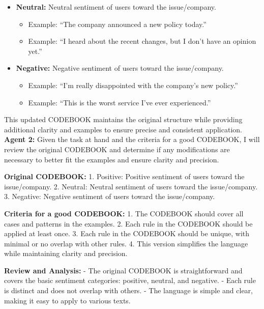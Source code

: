 \begin{itemize}
\tightlist
\item
  \textbf{Neutral:} Neutral sentiment of users toward the issue/company.

  \begin{itemize}
  \tightlist
  \item
    Example: ``The company announced a new policy today.''
  \item
    Example: ``I heard about the recent changes, but I don't have an
    opinion yet.''
  \end{itemize}
\item
  \textbf{Negative:} Negative sentiment of users toward the
  issue/company.

  \begin{itemize}
  \tightlist
  \item
    Example: ``I'm really disappointed with the company's new policy.''
  \item
    Example: ``This is the worst service I've ever experienced.''
  \end{itemize}
\end{itemize}

This updated CODEBOOK maintains the original structure while providing
additional clarity and examples to ensure precise and consistent
application.\\

\textbf{Agent 2:} Given the task at hand and the criteria for a good CODEBOOK, I
will review the original CODEBOOK and determine if any modifications are
necessary to better fit the examples and ensure clarity and precision.

\textbf{Original CODEBOOK:} 1. Positive: Positive sentiment of users
toward the issue/company. 2. Neutral: Neutral sentiment of users toward
the issue/company. 3. Negative: Negative sentiment of users toward the
issue/company.

\textbf{Criteria for a good CODEBOOK:} 1. The CODEBOOK should cover all
cases and patterns in the examples. 2. Each rule in the CODEBOOK should
be applied at least once. 3. Each rule in the CODEBOOK should be unique,
with minimal or no overlap with other rules. 4. This version simplifies
the language while maintaining clarity and precision.

\textbf{Review and Analysis:} - The original CODEBOOK is straightforward
and covers the basic sentiment categories: positive, neutral, and
negative. - Each rule is distinct and does not overlap with others. -
The language is simple and clear, making it easy to apply to various
texts.

